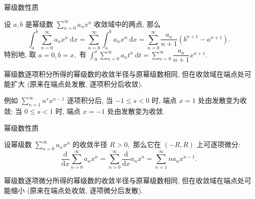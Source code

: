 \begin{frame}{幂级数性质}

\begin{thm}[逐项可积性]
设 $a, b$ 是幂级数 $\sum\limits_{n=0}^\infty a_n x^n$ 收敛域中的两点, 那么
\vspace{-0.7em}
\[\int_a^b \sum\limits_{n=0}^\infty a_n x^n ~ \mathrm{d} x = \sum\limits_{n=0}^\infty \int_a^b a_n x^n ~ \mathrm{d} x = \sum\limits_{n=0}^\infty \dfrac{a_n}{n+1} (b^{n+1} - a^{n+1}).\]
特别地, 取 $a = 0, b = x,$ 有 $\int_0^x \sum\limits_{n=0}^\infty a_n t^n ~ \mathrm{d} t = \sum\limits_{n=0}^\infty \dfrac{a_n}{n+1} x^{n+1}.$
\end{thm}

\pause

\begin{attnblock}
幂级数逐项积分所得的幂级数的收敛半径与原幂级数相同, 但在收敛域在端点处可能扩大 (原来在端点处发散, 逐项积分后收敛).
\end{attnblock}

\pause

例如 $\sum\limits_{n=1}^\infty n^s x^{n-1}$ 逐项积分后, 当 $-1 \leqslant s < 0$ 时, 端点 $x = 1$ 处由发散变为收敛; 当 $0 \leqslant s < 1$ 时, 端点 $x = -1$ 处由发散变为收敛.

\end{frame}


\begin{frame}{幂级数性质}

\begin{thm}[逐项可微性]
设幂级数 $\sum\limits_{n=0}^\infty a_n x^n$ 的收敛半径 $R > 0,$ 那么它在 $(-R, R)$ 上可逐项微分:
\[\dfrac{\mathrm{d}}{\mathrm{d} x} \sum\limits_{n=0}^\infty a_n x^n = \sum\limits_{n=0}^\infty \dfrac{\mathrm{d}}{\mathrm{d} x} a_n x^n = \sum\limits_{n=1}^\infty n a_n x^{n-1}.\]
\end{thm}

\pause

\begin{attnblock}
幂级数逐项微分所得的幂级数的收敛半径与原幂级数相同, 但在收敛域在端点处可能缩小 (原来在端点处收敛, 逐项微分后发散).
\end{attnblock}

\end{frame}


